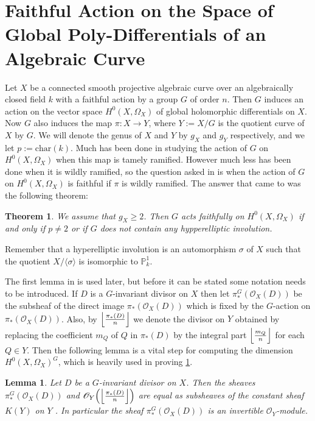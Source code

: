 \documentclass[11pt]{article} %
\newtheorem{thm}{Theorem}
\newtheorem{lem}{Lemma}
\begin{document}
\section{Faithful Action on the Space of Global Poly-Differentials of an Algebraic Curve}


Let $X$ be a connected smooth projective algebraic curve over an algebraically closed field $k$ with a faithful action 
by a group $G$ of order $n$. Then $G$ induces an action on the vector space $H^0(X,\Omega_X)$ of global holomorphic 
differentials on $X$. Now $G$ also induces the map $\pi:X\rightarrow Y$, where $Y:= X/G$ is the quotient curve of $X$ by $G$. 
We will denote the genus of $X$ and $Y$ by $g_X$ and $g_Y$ respectively, and we let $p:=\mbox{char}(k)$. 
Much has been done in studying the action of $G$ on $H^0(X,\Omega_X)$ when this map is tamely ramified. 
However much less has been done when it is wildly ramified, so the question asked in \citep{faithfulaction} is when the 
action of $G$ on $H^0(X,\Omega_X)$ is faithful if $\pi$ is wildly ramified. 
The answer that \citep{faithfulaction} came to was the following theorem:\\

\begin{thm}\label{main}
	We assume that $g_X\geq 2$. Then $G$ acts faithfully on $H^0(X,\Omega_X)$ if and only if $p\neq 2$ or if $G$ 
	does not contain any hypperelliptic involution.
\end{thm}

Remember that a hyperelliptic involution is an automorphism $\sigma$ of $X$ such that the quotient $X/\langle\sigma\rangle$ 
is isomorphic to $\mathbb{P}_k^1$.

The first lemma in \citep{faithfulaction} is used later, but before it can be stated some notation needs to be introduced. 
If $D$ is a $G$-invariant divisor on $X$ then let $\pi_*^G(\mathscr{O}_X(D))$ be the subsheaf of the direct image 
$\pi_*(\mathscr{O}_X(D))$ which is fixed by the $G$-action on $\pi_*(\mathscr{O}_X(D))$. Also, 
by $\Big{\lfloor}\frac{\pi_*(D)}{n}\Big{\rfloor}$ we denote the divisor on $Y$ obtained by replacing the 
coefficient $m_Q$ of $Q$ in $\pi_*(D)$ by the integral part $\Big{\lfloor}\frac{m_Q}{n}\Big{\rfloor}$ for each $Q\in Y$. 
Then the following lemma is a vital step for computing the dimension $H^0(X,\Omega_X)^G$, which is heavily used 
in proving \ref{main}.\\

\begin{lem}
	Let $D$ be a $G$-invariant divisor on $X$. Then the sheaves $\pi_*^G(\mathscr{O}_X(D))$ and 
	$\mathscr{O}_Y\Big(\Big{\lfloor}\frac{\pi_*(D)}{n}\Big{\rfloor}\Big)$ are equal as subsheaves of 
	the constant sheaf $K(Y)$ on $Y$ . In particular the sheaf $\pi_*^G(\mathscr{O}_X(D))$ is an 
	invertible $\mathscr{O}_Y$-module.
\end{lem}
\end{document}
